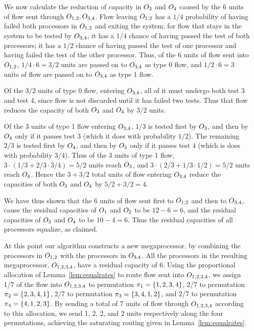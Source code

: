 \documentclass{article}
\newcounter{ass}
\newcommand{\processor}{processor}
\newcommand{\megaprocessor}{mega\processor}
\begin{document}
We now calculate the reduction of
capacity in $O_{3}$ and $O_{4}$ caused by the $6$ units of flow sent through $O_{1,2},O_{3,4}$.
Flow leaving $O_{1,2}$ 
 has a $1/4$ probability of having failed both {\processor}s in 
$O_{1,2}$ and exiting the system; for flow that stays in the system 
to be tested by $O_{3,4}$, it has a $1/4$ chance of having passed the test of 
both {\processor}s; it has a $1/2$ chance of having passed the test of one {\processor} and having failed 
the test of the other {\processor}.   
Thus, of the 6 units of flow sent into $O_{1,2}$, $1/4\cdot6 = 3/2$ units are 
passed on to $O_{3,4}$ as type 0 flow,
and $1/2\cdot6 = 3$ units of flow are passed on to $O_{3,4}$ as type 1 flow.

Of the $3/2$ units of type 0 flow, 
entering $O_{3,4}$,
all of it must undergo both test 3 and test 4, since flow is not discarded
until it has failed two tests.  Thus that flow reduces the 
capacity of both $O_{3}$ and $O_{4}$ by $3/2$ units.

Of the 3 units of type 1 flow entering $O_{3,4}$, 
$1/3$ is tested first by $O_{3}$, and then by $O_{4}$ only if it passes test $3$ (which it does
with probability $1/2$).
The remaining $2/3$ is tested first by $O_{4}$, and then by $O_{3}$ only if it passes test $4$ (which
is does with probability $3/4$).
Thus of the 3 units of type 1 flow, $3\cdot(1/3+2/3\cdot3/4) = 5/2$ units reach $O_{3}$,
and $3\cdot(2/3+1/3\cdot1/2) = 5/2$ units reach $O_{4}$. 
Hence the $3+3/2$ total units of flow entering $O_{3,4}$ reduce
the capacities of both $O_{3}$ and $O_{4}$ by
$5/2 + 3/2 = 4$.

We have thus shown that the
6 units of flow sent first to $O_{1,2}$ and then to $O_{3,4}$, 
cause the residual capacities of $O_{1}$ and $O_{2}$
to be $12 - 6 = 6$, and the residual capacities of $O_{3}$ and $O_{4}$
to be $10 - 4 = 6$.  Thus the residual capacities of all {\processor}s equalize, as claimed.

At this point our algorithm constructs a new {\megaprocessor}, by combining the {\processor}s in
$O_{1,2}$ with the {\processor}s in $O_{3,4}$.    All the {\processor}s in the resulting
{\megaprocessor}, $O_{1,2,3,4}$, have
a residual capacity of $6$.  Using the proportional allocation of Lemma~\ref{lem:equalrates} to route flow sent into $O_{1,2,3,4}$, we assign
1/7 of the flow into $O_{1,2,3,4}$ to permutation
$\pi_1=\{1,2,3,4\}$, 2/7 to permutation
$\pi_2=\{2,3,4,1\}$, 2/7 to permutation
$\pi_3=\{3,4,1,2\}$, and 2/7 to permutation
$\pi_4=\{4,1,2,3\}$.
By sending a total of 7 units of flow through
$O_{1,2,3,4}$ according to
this allocation, we send 1, 2, 2, and 2 units respectively along
the four permutations, 
achieving the saturating routing
given in Lemma~\ref{lem:equalrates}.
\end{document}
